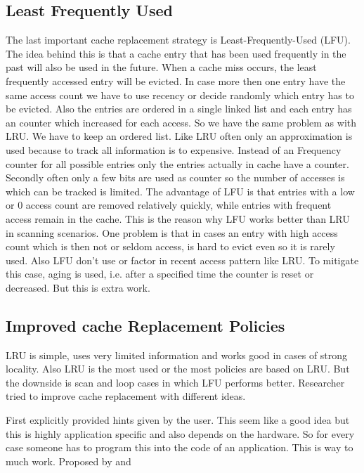 \documentclass[
	12pt,
	a4paper,
	abstract,
	bibliography=totoc,
	chapterprefix,
	headings=openright,
	numbers=endperiod,
	parskip=half,
	twoside,
]{scrreprt}
\begin{document}
\subsection{Least Frequently Used}
The last important cache replacement strategy is Least-Frequently-Used (LFU).
The idea behind this is that a cache entry that has been used frequently in the past will also be used in the future.
When a cache miss occurs, the least frequently accessed entry will be evicted.
In case more then one entry have the same access count we have to use recency or decide randomly which entry has to be evicted.
Also the entries are ordered in a single linked list and each entry has an counter which increased for each access.
So we have the same problem as with LRU. We have to keep an ordered list.
Like LRU often only an approximation is used because to track all information is to expensive.
Instead of an Frequency counter for all possible entries only the entries actually in cache have a counter.
Secondly often only a few bits are used as counter so the number of accesses is which can be tracked is limited. 
The advantage of LFU is that entries with a low or 0 access count are removed relatively quickly, while entries with frequent access remain in the cache.
This is the reason why LFU works better than LRU in scanning scenarios.
One problem is that in cases an entry with high access count which is then not or seldom access, is hard to evict even so it is rarely used.
Also LFU don't use or factor in recent access pattern like LRU.
To mitigate this case, aging is used, i.e. after a specified time the counter is reset or decreased.
But this is extra work.

\subsection{Improved cache Replacement Policies}

LRU is simple, uses very limited information and works good in cases of strong locality.
Also LRU is the most used or the most policies are based on LRU.
But the downside is scan and loop cases in which LFU performs better.
Researcher tried to improve cache replacement with different ideas.

First explicitly provided hints given by the user.
This seem like a good idea but this is highly application specific and also depends on the hardware.
So for every case someone has to program this into the code of an application.
This is way to much work.
Proposed by \cite{cao1994application} and \cite{patterson1995informed}
\end{document}
